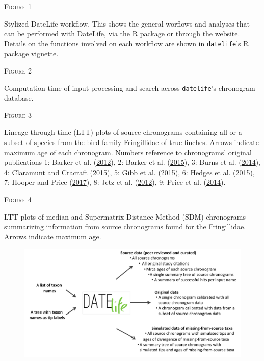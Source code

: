 \documentclass[]{article}
\begin{document}
\newpage

\begin{center}
\textsc{Figure 1}
\end{center}
Stylized DateLife workflow. This shows the general worflows and analyses that can be performed with DateLife, via the R package or through the website. Details on the functions involved on each workflow are shown in \texttt{datelife}'s R package vignette.

\begin{center}
\textsc{Figure 2}
\end{center}
Computation time of input processing and search across \texttt{datelife}'s chronogram database.

\begin{center}
\textsc{Figure 3}
\end{center}
Lineage through time (LTT) plots of source chronograms containing all or a subset of species from the bird family Fringillidae of true finches. Arrows indicate maximum age of each chronogram. Numbers reference to chronograms' original publications 1: Barker et al. (\protect\hyperlink{ref-barker2012going}{2012}), 2: Barker et al. (\protect\hyperlink{ref-barker2015new}{2015}), 3: Burns et al. (\protect\hyperlink{ref-burns2014phylogenetics}{2014}), 4: Claramunt and Cracraft (\protect\hyperlink{ref-claramunt2015new}{2015}), 5: Gibb et al. (\protect\hyperlink{ref-gibb2015new}{2015}), 6: Hedges et al. (\protect\hyperlink{ref-Hedges2015}{2015}), 7: Hooper and Price (\protect\hyperlink{ref-hooper2017chromosomal}{2017}), 8: Jetz et al. (\protect\hyperlink{ref-Jetz2012}{2012}), 9: Price et al. (\protect\hyperlink{ref-price2014niche}{2014}).

\begin{center}
\textsc{Figure 4}
\end{center}
LTT plots of median and Supermatrix Distance Method (SDM) chronograms summarizing information from source chronograms found for the Fringillidae. Arrows indicate maximum age.

\newpage

\begin{figure}[!h]
\includegraphics{Fig1.pdf}
\caption{}
\label{fig:workflow}
\end{figure}
\end{document}
